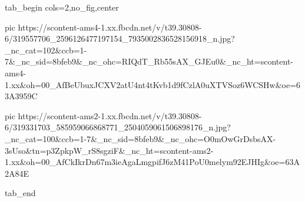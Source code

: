  
 
 
 
 


\ifcmt
  tab_begin cols=2,no_fig,center

     pic https://scontent-ams4-1.xx.fbcdn.net/v/t39.30808-6/319557706_2596126477197154_7935002836528156918_n.jpg?_nc_cat=102&ccb=1-7&_nc_sid=8bfeb9&_nc_ohc=RIQdT_Rb55sAX_GJEu0&_nc_ht=scontent-ams4-1.xx&oh=00_AfBeUbuxJCXV2atU4nt4tKvb1d9fCzlA0uXTVSoz6WCSHw&oe=63A3959C

     pic https://scontent-ams2-1.xx.fbcdn.net/v/t39.30808-6/319331703_585959066868771_2504059061506898176_n.jpg?_nc_cat=100&ccb=1-7&_nc_sid=8bfeb9&_nc_ohc=O0mOwGrDsbsAX-3sUso&tn=p3ZpkpW_rS8sgziF&_nc_ht=scontent-ams2-1.xx&oh=00_AfCkIkrDn67m3ieAgaLmgpifJ6zM41PoU0melym92EJHIg&oe=63A2A84E 

  tab_end
\fi
